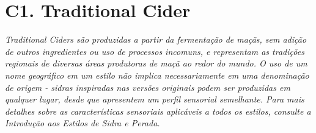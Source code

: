 \section*{C1. Traditional Cider}
\textit{Traditional Ciders são produzidas a partir da fermentação de maçãs, sem adição de outros ingredientes ou uso de processos incomuns, e representam as tradições regionais de diversas áreas produtoras de maçã ao redor do mundo. O uso de um nome geográfico em um estilo não implica necessariamente em uma denominação de origem - sidras inspiradas nas versões originais podem ser produzidas em qualquer lugar, desde que apresentem um perfil sensorial semelhante. Para mais detalhes sobre as características sensoriais aplicáveis a todos os estilos, consulte a Introdução aos Estilos de Sidra e Perada.}
